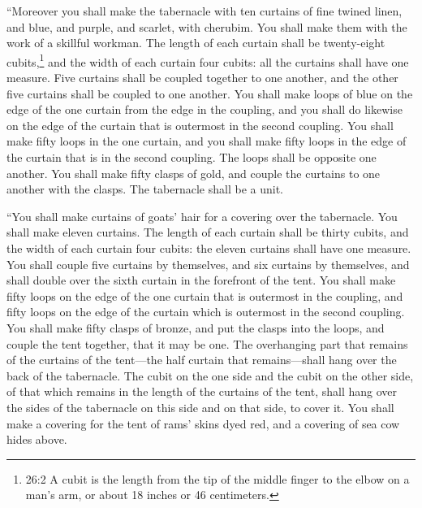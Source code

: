 \mychapter{} \myverse*{}“Moreover you shall make the tabernacle with ten curtains of fine
twined linen, and blue, and purple, and scarlet, with cherubim. You shall make them with the work of a
skillful workman.
\myverse{}The length of each curtain shall be twenty-eight cubits,\footnote{26:2 A cubit is the length from the tip of the middle finger to the elbow on a man’s arm, or about
	18 inches or 46 centimeters.} and the width of each curtain four cubits: all the curtains shall
have one measure.
\myverse{}Five curtains shall be coupled together to one another, and the other five
curtains shall be coupled to one another.
\myverse{}You shall make loops of blue on the edge of the one curtain from the edge in
the coupling, and you shall do likewise on the edge of the curtain that is outermost in the second coupling.
\myverse{}You shall make fifty loops in the one curtain, and you shall make fifty loops
in the edge of the curtain that is in the second coupling. The loops shall be opposite one another.
\myverse{}You shall make fifty clasps of gold, and couple the curtains to one another
with the clasps. The tabernacle shall be a unit.


\myverse{}“You shall make curtains of goats’ hair for a covering over the
tabernacle. You shall make eleven curtains.
\myverse{}The length of each curtain shall be thirty cubits, and the width of each curtain
four cubits: the eleven curtains shall have one measure.
\myverse{}You shall couple five curtains by themselves, and six curtains by themselves,
and shall double over the sixth curtain in the forefront of the tent.
\myverse{}You shall make fifty loops on the edge of the one curtain that is outermost
in the coupling, and fifty loops on the edge of the curtain which is outermost in the second coupling.
\myverse{}You shall make fifty clasps of bronze, and put the clasps into the loops,
and couple the tent together, that it may be one.
\myverse{}The overhanging part that remains of the curtains of the tent—the half curtain
that remains—shall hang over the back of the tabernacle.
\myverse{}The cubit on the one side and the cubit on the other side, of that which
remains in the length of the curtains of the tent, shall hang over the sides of the tabernacle on this
side and on that side, to cover it.
\myverse{}You shall make a covering for the tent of rams’ skins dyed red, and a covering
of sea cow hides above.


